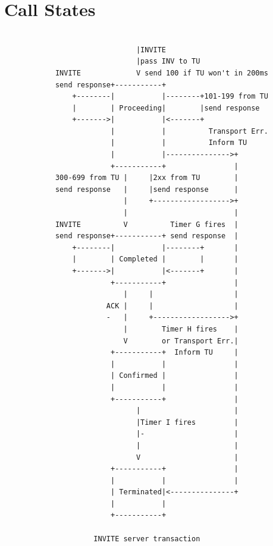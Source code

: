 \documentclass[a4paper]{report}
\begin{document}
\pagebreak
\section{Call States}

\begin{verbatim}

                               |INVITE
                               |pass INV to TU
            INVITE             V send 100 if TU won't in 200ms
            send response+-----------+
                +--------|           |--------+101-199 from TU
                |        | Proceeding|        |send response
                +------->|           |<-------+
                         |           |          Transport Err.
                         |           |          Inform TU
                         |           |--------------->+
                         +-----------+                |
            300-699 from TU |     |2xx from TU        |
            send response   |     |send response      |
                            |     +------------------>+
                            |                         |
            INVITE          V          Timer G fires  |
            send response+-----------+ send response  |
                +--------|           |--------+       |
                |        | Completed |        |       |
                +------->|           |<-------+       |
                         +-----------+                |
                            |     |                   |
                        ACK |     |                   |
                        -   |     +------------------>+
                            |        Timer H fires    |
                            V        or Transport Err.|
                         +-----------+  Inform TU     |
                         |           |                |
                         | Confirmed |                |
                         |           |                |
                         +-----------+                |
                               |                      |
                               |Timer I fires         |
                               |-                     |
                               |                      |
                               V                      |
                         +-----------+                |
                         |           |                |
                         | Terminated|<---------------+
                         |           |
                         +-----------+

                     INVITE server transaction
                     
\end{verbatim}
\end{document}
